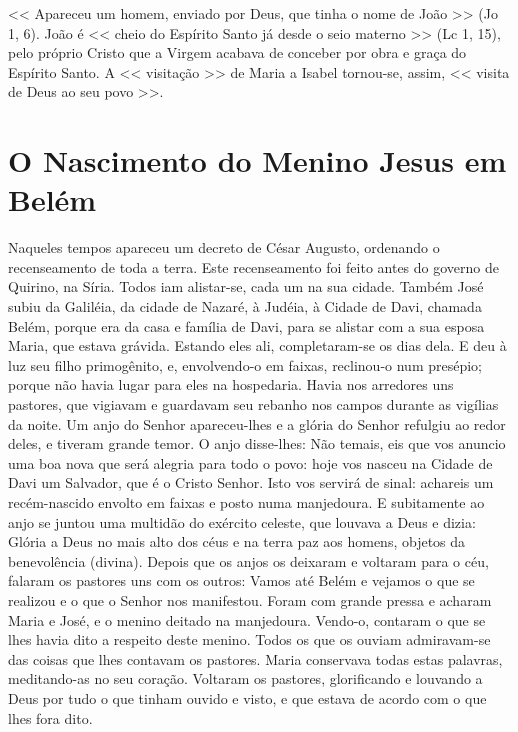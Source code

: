 \documentclass{rosario}
\begin{document}

<< Apareceu um homem, enviado por Deus, que tinha o nome de João >> (Jo 1, 6).
João é << cheio do Espírito Santo já desde o seio materno >> (Lc 1, 15), pelo próprio Cristo que a Virgem acabava de conceber por obra e graça do Espírito Santo.
A << visitação >> de Maria a Isabel tornou-se, assim, << visita de Deus ao seu povo >>.


\section{O Nascimento do Menino Jesus em Belém}


\TODO



Naqueles tempos apareceu um decreto de César Augusto, ordenando o recenseamento de toda a terra.
Este recenseamento foi feito antes do governo de Quirino, na Síria.
Todos iam alistar-se, cada um na sua cidade.
Também José subiu da Galiléia, da cidade de Nazaré, à Judéia, à Cidade de Davi, chamada Belém, porque era da casa e família de Davi,
para se alistar com a sua esposa Maria, que estava grávida.
Estando eles ali, completaram-se os dias dela.
E deu à luz seu filho primogênito, e, envolvendo-o em faixas, reclinou-o num presépio;
porque não havia lugar para eles na hospedaria.
Havia nos arredores uns pastores, que vigiavam e guardavam seu rebanho nos campos durante as vigílias da noite.
Um anjo do Senhor apareceu-lhes e a glória do Senhor refulgiu ao redor deles, e tiveram grande temor.
O anjo disse-lhes:
Não temais, eis que vos anuncio uma boa nova que será alegria para todo o povo:
hoje vos nasceu na Cidade de Davi um Salvador, que é o Cristo Senhor.
Isto vos servirá de sinal:
achareis um recém-nascido envolto em faixas e posto numa manjedoura.
E subitamente ao anjo se juntou uma multidão do exército celeste, que louvava a Deus e dizia:
Glória a Deus no mais alto dos céus e na terra paz aos homens, objetos da benevolência (divina).
Depois que os anjos os deixaram e voltaram para o céu, falaram os pastores uns com os outros:
Vamos até Belém e vejamos o que se realizou e o que o Senhor nos manifestou.
Foram com grande pressa e acharam Maria e José, e o menino deitado na manjedoura.
Vendo-o, contaram o que se lhes havia dito a respeito deste menino.
Todos os que os ouviam admiravam-se das coisas que lhes contavam os pastores.
Maria conservava todas estas palavras, meditando-as no seu coração.
Voltaram os pastores, glorificando e louvando a Deus por tudo o que tinham ouvido e visto, e que estava de acordo com o que lhes fora dito.
\end{document}
